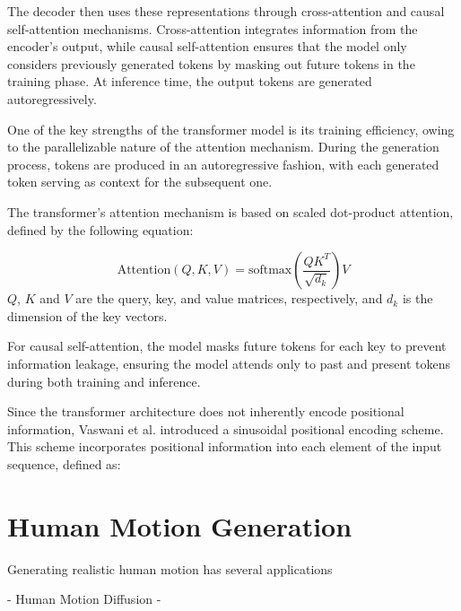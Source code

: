 The decoder then uses these representations through cross-attention and causal self-attention mechanisms. Cross-attention integrates information from the encoder's output, while causal self-attention ensures that the model only considers previously generated tokens by masking out future tokens in the training phase. At inference time, the output tokens are generated autoregressively. 

One of the key strengths of the transformer model is its training efficiency, owing to the parallelizable nature of the attention mechanism. During the generation process, tokens are produced in an autoregressive fashion, with each generated token serving as context for the subsequent one.

The transformer's attention mechanism is based on scaled dot-product attention, defined by the following equation:

\begin{equation}
    \text{Attention}(Q, K, V) = \text{softmax}\left(\frac{Q K^T}{\sqrt{d_k}} \right) V
\end{equation}
$Q$, $K$ and $V$ are the query, key, and value matrices, respectively, and $d_k$ is the dimension of the key vectors.

For causal self-attention, the model masks future tokens for each key to prevent information leakage, ensuring the model attends only to past and present tokens during both training and inference.

Since the transformer architecture does not inherently encode positional information, Vaswani et al. introduced a sinusoidal positional encoding scheme. This scheme incorporates positional information into each element of the input sequence, defined as:



\section{Human Motion Generation}
Generating realistic human motion has several applications 


- Human Motion Diffusion
- 


